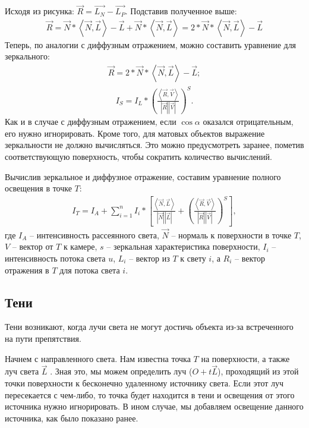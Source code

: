 Исходя из рисунка: $\vec{R} = \vec{L_{N}} -\vec{L_{P}} $. Подставив полученное выше:
\begin{gather}
	\vec{R} = \vec{N}*\left\langle{\vec{N}, \vec{L}}\right\rangle - \vec{L} + \vec{N}*\left\langle{\vec{N}, \vec{L}}\right\rangle = 2*\vec{N}*\left\langle{\vec{N}, \vec{L}}\right\rangle - \vec{L}
\end{gather}
Теперь, по аналогии с диффузным отражением, можно составить уравнение для зеркального:
\begin{gather}
	\vec{R} = 2*\vec{N}*\left\langle{\vec{N}, \vec{L}}\right\rangle - \vec{L};
\end{gather}
\begin{gather}
	I_{S} = I_{L}*\left( \frac{\left\langle{\vec{R}, \vec{V}}\right\rangle}{\left| {\vec{R}} \right| \left| {\vec{V}} \right|} \right)^{S}.
\end{gather}
Как и в случае с диффузным отражением, если $\cos{\alpha}$ оказался отрицательным, его нужно игнорировать. Кроме того, для матовых объектов выражение зеркальности не должно вычисляться. Это можно предусмотреть заранее, пометив соответствующую поверхность, чтобы сократить количество вычислений.

Вычислив зеркальное и диффузное отражение, составим уравнение полного освещения в точке $T$:
\begin{gather}
	I_{T} = I_{A} + \sum_{i=1}^n I_{i}*\left[ {\frac{\left\langle{\vec{N}, \vec{L}}\right\rangle}{\left| {\vec{N}} \right| \left| {\vec{L}} \right|} + \left( \frac{\left\langle{\vec{R}, \vec{V}}\right\rangle}{\left| {\vec{R}} \right| \left| {\vec{V}} \right|} \right)^{S}} \right],
\end{gather}
где $I_{A}$ – интенсивность рассеянного света, $\vec{N}$ – нормаль к поверхности в
точке $T$, $V$ – вектор от $T$ к камере, $s$ – зеркальная характеристика поверхности, $I_{i}$ – интенсивность потока света $u$, $L_{i}$ – вектор из $T$ к свету $i$, а $R_{i}$ – вектор отражения в $T$ для потока света $i$.

\subsection{Тени}

Тени возникают, когда лучи света не могут достичь объекта из-за встреченного на пути препятствия.

Начнем с направленного света. Нам известна точка $T$ на поверхности, а также луч света $\vec{L}$ . Зная это, мы можем определить луч ($O+t\vec{L}$), проходящий из этой точки поверхности к бесконечно удаленному источнику света. Если этот луч пересекается с чем-либо, то точка будет находится в тени и освещения от этого источника нужно игнорировать. В ином случае, мы добавляем освещение данного источника, как было показано ранее.

